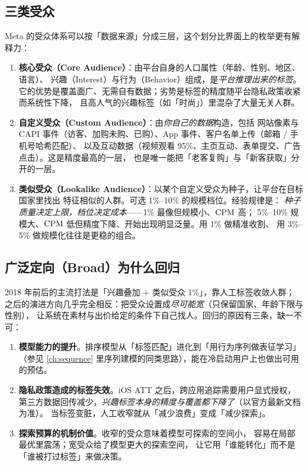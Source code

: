 \subsection{三类受众}

Meta 的受众体系可以按「数据来源」分成三层，这个划分比界面上的枚举更有解释力：

\begin{enumerate}
  \item \textbf{核心受众（Core Audience）}：由平台自身的人口属性（年龄、性别、地区、语言）、
        兴趣（Interest）与行为（Behavior）组成，是\emph{平台推理出来的标签}。
        它的优势是覆盖面广、无需自有数据；劣势是标签的精度随平台隐私政策收紧而系统性下降，
        且高人气的兴趣标签（如「时尚」）里混杂了大量无关人群。
  \item \textbf{自定义受众（Custom Audience）}：由\emph{你自己的数据}构造，包括
        网站像素与 CAPI 事件（访客、加购未购、已购）、App 事件、客户名单上传（邮箱 / 手机号哈希匹配）、
        以及互动数据（视频观看 95\%、主页互动、表单提交、广告点击）。这是精度最高的一层，
        也是唯一能把「老客复购」与「新客获取」分开的一层。
  \item \textbf{类似受众（Lookalike Audience）}：以某个自定义受众为种子，让平台在目标国家里找出
        特征相似的人群。可选 1\%--10\% 的规模档位。经验规律是：
        \emph{种子质量决定上限，档位决定成本}——1\% 最像但规模小、$\operatorname{CPM}$ 高；
        5\%--10\% 规模大、$\operatorname{CPM}$ 低但精度下降、开始出现明显泛量。用 1\% 做精准收割、
        用 3\%--5\% 做规模化往往是更稳的组合。
\end{enumerate}

\subsection{广泛定向（Broad）为什么回归}

2018 年前后的主流打法是「兴趣叠加 + 类似受众 1\%」，靠人工标签收敛人群；
之后的演进方向几乎完全相反：把受众设置成\emph{尽可能宽}（只保留国家、年龄下限与性别），
让系统在素材与出价给定的条件下自己找人。回归的原因有三条，缺一不可：

\begin{enumerate}
  \item \textbf{模型能力的提升}。排序模型从「标签匹配」进化到「用行为序列做表征学习」
        （参见 \cref{ch:sequence} 里序列建模的同类思路），能在冷启动用户上也做出可用的预估。
  \item \textbf{隐私政策造成的标签失效}。iOS ATT 之后，跨应用追踪需要用户显式授权，
        第三方数据回传减少，\emph{兴趣标签本身的精度与覆盖都下降了}（以官方最新文档为准）。
        当标签变脏，人工收窄就从「减少浪费」变成「减少探索」。
  \item \textbf{探索预算的机制价值}。收窄的受众意味着模型可探索的空间小，
        容易在局部最优里震荡；宽受众给了模型更大的探索空间，
        让它用「谁能转化」而不是「谁被打过标签」来做决策。
\end{enumerate}

